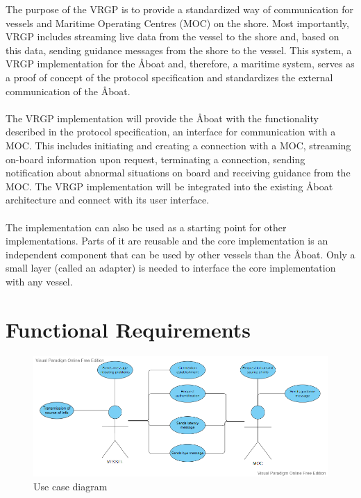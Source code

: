 The purpose of the VRGP is to provide a standardized way of communication for vessels and Maritime Operating Centres (MOC) on the shore. Most importantly, VRGP includes streaming live data from the vessel to the shore and, based on this data, sending guidance messages from the shore to the vessel. This system, a VRGP implementation for the Åboat and, therefore, a maritime system, serves as a proof of concept of the protocol specification and standardizes the external communication of the Åboat.
\\\\
The VRGP implementation will provide the Åboat with the functionality described in the protocol specification, an interface for communication with a MOC. This includes initiating and creating a connection with a MOC, streaming on-board information upon request, terminating a connection, sending notification about abnormal situations on board and receiving guidance from the MOC. The VRGP implementation will be integrated into the existing Åboat architecture and connect with its user interface.
\\\\
The implementation can also be used as a starting point for other implementations. Parts of it are reusable and the core implementation is an independent component that can be used by other vessels than the Åboat. Only a small layer (called an adapter) is needed to interface the core implementation with any vessel.

\newpage

\section{Functional Requirements}\label{sec:func-requirements}

\begin{figure}[ht]
	\centering
	\includegraphics[width=\linewidth]{diagrams/use-case-diagram}
	\caption{Use case diagram}
	\label{fig:use-case-diagram}
\end{figure}

